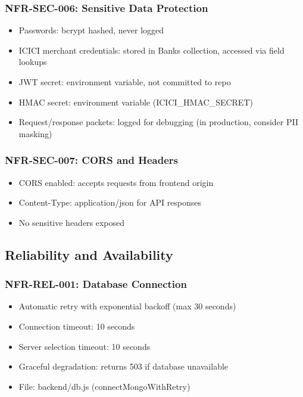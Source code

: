 \documentclass[12pt,a4paper]{article}
\begin{document}
\subsubsection{NFR-SEC-006: Sensitive Data Protection}
\begin{itemize}
  \item Passwords: bcrypt hashed, never logged
  \item ICICI merchant credentials: stored in Banks collection, accessed via field lookups
  \item JWT secret: environment variable, not committed to repo
  \item HMAC secret: environment variable (ICICI\_HMAC\_SECRET)
  \item Request/response packets: logged for debugging (in production, consider PII masking)
\end{itemize}

\subsubsection{NFR-SEC-007: CORS and Headers}
\begin{itemize}
  \item CORS enabled: accepts requests from frontend origin
  \item Content-Type: application/json for API responses
  \item No sensitive headers exposed
\end{itemize}

\subsection{Reliability and Availability}

\subsubsection{NFR-REL-001: Database Connection}
\begin{itemize}
  \item Automatic retry with exponential backoff (max 30 seconds)
  \item Connection timeout: 10 seconds
  \item Server selection timeout: 10 seconds
  \item Graceful degradation: returns 503 if database unavailable
  \item File: backend/db.js (connectMongoWithRetry)
\end{itemize}
\end{document}
